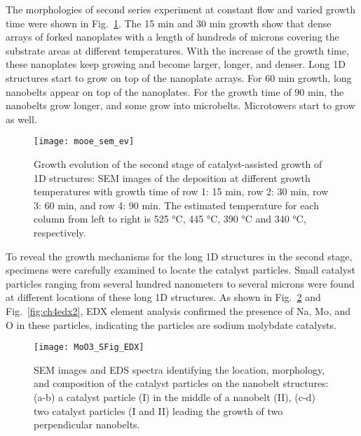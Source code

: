 The morphologies of second series experiment at constant  flow and varied growth time were shown in Fig.~\ref{fig:ch4ev}. The 15 min and 30 min growth show that dense arrays of  forked nanoplates with a length of hundreds of microns covering the substrate areas at different temperatures. With the increase of the growth time, these nanoplates keep growing and become larger, longer, and denser. Long 1D  structures start to grow on top of the nanoplate arrays. For 60 min growth, long nanobelts appear on top of the nanoplates. For the growth time of 90 min, the nanobelts grow longer, and some grow into microbelts. Microtowers start to grow as well.

\begin{figure}[htb]
\centering
\texttt{[image: mooe\_sem\_ev]}
\caption[Growth evolution of : second stage]{Growth evolution of the second stage of catalyst-assisted growth of  1D structures: SEM images of the deposition at different growth temperatures with growth time of row 1: 15 min, row 2: 30 min, row 3: 60 min, and row 4: 90 min. The estimated temperature for each column from left to right is 525 \si{\degreeCelsius}, 445 \si{\degreeCelsius}, 390 \si{\degreeCelsius} and 340 \si{\degreeCelsius}, respectively. }
\label{fig:ch4ev}
\end{figure}


To reveal the growth mechanisms for the long 1D structures in the second stage, specimens were carefully examined to locate the catalyst particles. Small catalyst particles ranging from several hundred nanometers to several microns were found at different locations of these long 1D structures. As shown in Fig.~\ref{fig:ch4edx1} and Fig.~\ref{fig:ch4edx2}, EDX element analysis confirmed the presence of Na, Mo, and O in these particles, indicating the particles are sodium molybdate catalysts.  

\begin{figure}[htb]
\centering
\texttt{[image: MoO3\_SFig\_EDX]}
\caption[Growth evolution of : second stage]{SEM images and EDS spectra identifying the location, morphology, and composition of the catalyst particles on the nanobelt structures: (a-b) a catalyst particle (I) in the middle of a nanobelt (II), (c-d) two catalyst particles (I and II) leading the growth of two perpendicular nanobelts. }
\label{fig:ch4edx1}
\end{figure}


